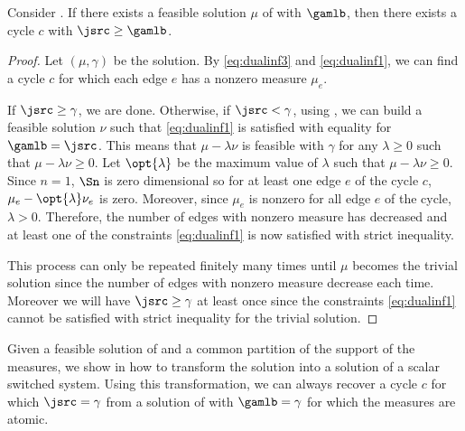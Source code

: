 \begin{lemma}
  \label{lem:instabcerts}
  Consider .
  If there exists a feasible solution $\mu$ of  with $\gamlb$,
  then there exists a cycle $c$ with $\jsrc \geq \gamlb$.
  \begin{proof}
    Let $(\mu, \gamma)$ be the solution.
    By \eqref{eq:dualinf3} and \eqref{eq:dualinf1}, we can find a cycle $c$ for which each edge $e$ has a nonzero measure $\mu_e$.

    If $\jsrc \geq \gamma$, we are done.
    Otherwise, if $\jsrc < \gamma$, using ,
    we can build a feasible solution $\nu$ such that \eqref{eq:dualinf1} is satisfied with equality for $\gamlb = \jsrc$.
    This means that $\mu - \lambda \nu$ is feasible with $\gamma$ for any $\lambda \geq 0$ such that $\mu - \lambda \nu \geq 0$.
    Let $\opt{\lambda}$ be the maximum value of $\lambda$ such that $\mu - \lambda \nu \geq 0$.
    Since $n = 1$, $\Sn$ is zero dimensional so for at least one edge $e$ of the cycle $c$, $\mu_e - \opt{\lambda} \nu_e$ is zero.
    Moreover, since $\mu_e$ is nonzero for all edge $e$ of the cycle, $\lambda > 0$.
    Therefore, the number of edges with nonzero measure has decreased and at least one of the constraints \eqref{eq:dualinf1} is now satisfied with strict inequality.

    This process can only be repeated finitely many times until $\mu$ becomes the trivial solution since the number of edges with nonzero measure decrease each time.
    Moreover we will have $\jsrc \geq \gamma$ at least once since the constraints \eqref{eq:dualinf1} cannot be satisfied with strict inequality for the trivial solution.
  \end{proof}
\end{lemma}

Given a feasible solution of  and a common partition of the support of the measures,
we show in  how to transform the solution into a solution of a scalar switched system.
Using this transformation, we can always recover a cycle $c$ for which $\jsrc = \gamma$ from a solution of  with $\gamlb = \gamma$ for which the measures are atomic.

